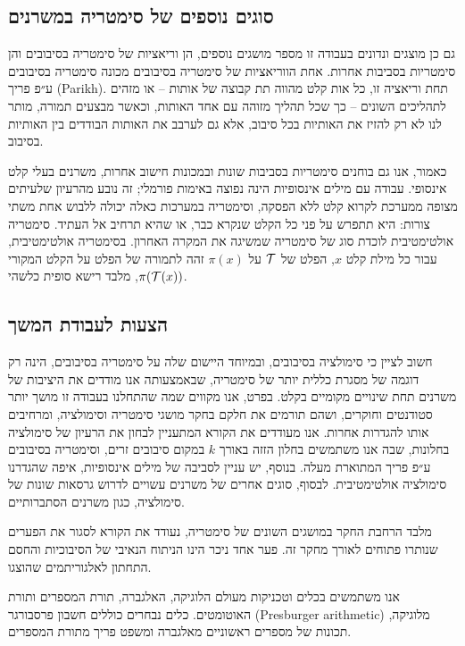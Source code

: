 {\subsection*{\texthebrew{סוגים נוספים של סימטריה במשרנים}}

גם כן מוצגים ונדונים בעבודה זו מספר מושגים נוספים, הן וריאציות של סימטריה בסיבובים והן סימטריות בסביבות אחרות. אחת הווריאציות של סימטריה בסיבובים מכונה סימטריה בסיבובים ע״פ פריך 
(\textenglish{Parikh}).
תחת וריאציה זו, כל אות קלט מהווה תת קבוצה של אותות – או מזהים לתהליכים השונים – כך שכל תהליך מזוהה עם אחד האותות, וכאשר מבצעים תמורה, מותר לנו לא רק להזיז את האותיות בכל סיבוב, אלא גם לערבב את האותות הבודדים בין האותיות בסיבוב.

כאמור, אנו גם בוחנים סימטריות בסביבות שונות ובמכונות חישוב אחרות, משרנים בעלי קלט אינסופי. עבודה עם מילים אינסופיות הינה נפוצה באימות פורמלי; זה נובע מהרעיון שלעיתים מצופה ממערכת לקרוא קלט ללא הפסקה, וסימטריה במערכות כאלה יכולה ללבוש אחת משתי צורות: היא תתפרש על פני כל הקלט שנקרא כבר, או שהיא תרחיב אל העתיד. סימטריה אולטימטיבית לוכדת סוג של סימטריה שמשיגה את המקרה האחרון. בסימטריה אולטימטיבית, עבור כל מילת קלט
$x$,
הפלט של
$\mathcal{T}$
על
$\pi(x)$
זהה לתמורה של הפלט על הקלט המקורי
$\pi(\mathcal{T}(x))$,
מלבד רישא סופית כלשהי.

\subsection*{\texthebrew{הצעות לעבודת המשך}}

חשוב לציין כי סימולציה בסיבובים, ובמיוחד היישום שלה על סימטריה בסיבובים, הינה רק דוגמה של מסגרת כללית יותר של סימטריה, שבאמצעותה אנו מודדים את היציבות של משרנים תחת שינויים מקומיים בקלט. בפרט, אנו מקווים שמה שהתחלנו בעבודה זו מושך יותר סטודנטים וחוקרים, ושהם תורמים את חלקם בחקר מושגי סימטריה וסימולציה, ומרחיבים אותו להגדרות אחרות. אנו מעודדים את הקורא המתעניין לבחון את הרעיון של סימולציה בחלונות, שבה אנו משתמשים בחלון הזזה באורך
$k$
במקום סיבובים זרים, וסימטריה בסיבובים ע״פ פריך המתוארת מעלה. בנוסף, יש עניין לסביבה של מילים אינסופיות, איפה שהגדרנו סימולציה אולטימטיבית. לבסוף, סוגים אחרים של משרנים עשויים לדרוש גרסאות שונות של סימולציה, כגון משרנים הסתברותיים. 

מלבד הרחבת החקר במושגים השונים של סימטריה, נעודד את הקורא לסגור את הפערים שנותרו פתוחים לאורך מחקר זה. פער אחד ניכר הינו הניתוח הנאיבי של הסיבוכיות והחסם התחתון לאלגוריתמים שהוצגו.

אנו משתמשים בכלים וטכניקות מעולם הלוגיקה, האלגברה, תורת המספרים ותורת האוטומטים. כלים נבחרים כוללים חשבון פרסבורגר
(\textenglish{Presburger arithmetic})
מלוגיקה, תכונות של מספרים ראשוניים מאלגברה ומשפט פריך מתורת המספרים.

}
